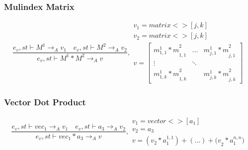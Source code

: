 \subsubsection{Mulindex Matrix}
\begin{equation}
	\frac { { e }_{ v },st\vdash { M }^{ 1 }{ \rightarrow  }_{ A }{ v }_{ 1 }\quad { e }_{ v },st\vdash { M }^{ 2 }{ \rightarrow  }_{ A }{ v }_{ 2 } }{ { e }_{ v },st\vdash { M }^{ 1 }\ast { M }^{ 2 }{ \rightarrow  }_{ A }{ v } } ,\begin{matrix} { v }_{ 1 }=matrix<>[j,k] \\ { { v }_{ 2 } }=matrix<>[j,k] \\ v=\begin{bmatrix} { { m }_{ 1,1 }^{ 1 }*m }_{ 1,1 }^{ 2 } & \dots  & { { m }_{ j,1 }^{ 1 }*m }_{ j,1 }^{ 2 } \\ \vdots  & \ddots  &  \\ { { m }_{ 1,k }^{ 1 }*m }_{ 1,k }^{ 2 } &  & { { m }_{ j,k }^{ 1 }*m }_{ j,k }^{ 2 } \end{bmatrix} \end{matrix}
\end{equation}

\subsubsection{Vector Dot Product}
\begin{equation}
	\frac { { e }_{ v },st\vdash { vec }_{ 1 }{ \rightarrow  }_{ A }{ v }_{ 1 }\quad { e }_{ v },st\vdash { a }_{ 3 }{ \rightarrow  }_{ A }{ v }_{ 2 } }{ { e }_{ v },st\vdash { vec }_{ 1 }\ast { a }_{ 3 }{ \rightarrow  }_{ A }{ v } } ,\begin{matrix} { v }_{ 1 }=vector<>[{ a }_{ 1 }] \\ { v }_{ 2 }={ a }_{ 3 } \\ v=({ v }_{ 2 }*{ a }_{ 1 }^{ 1,1 })+(...)+{ (v }_{ 2 }*{ a }_{ 1 }^{ n,n }) \end{matrix}
\end{equation}